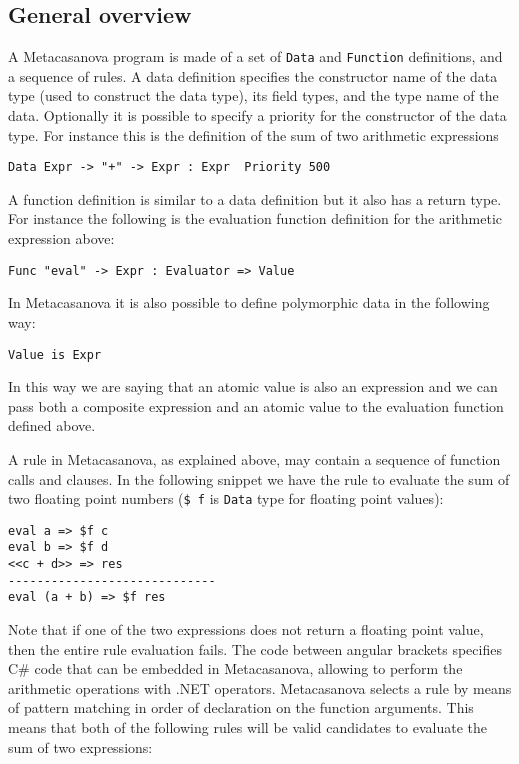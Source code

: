 \subsection{General overview}

A Metacasanova program is made of a set of \texttt{Data} and \texttt{Function} definitions, and a sequence of rules. A data definition specifies the constructor name of the data type (used to construct the data type), its field types, and the type name of the data. Optionally it is possible to specify a priority for the constructor of the data type. For instance this is the definition of the sum of two arithmetic expressions

\begin{lstlisting}
Data Expr -> "+" -> Expr : Expr  Priority 500
\end{lstlisting}

\noindent
A function definition is similar to a data definition but it also has a return type. For instance the following is the evaluation function definition for the arithmetic expression above:

\begin{lstlisting}
Func "eval" -> Expr : Evaluator => Value
\end{lstlisting}

\noindent
In Metacasanova it is also possible to define polymorphic data in the following way:

\begin{lstlisting}
Value is Expr
\end{lstlisting}

\noindent
In this way we are saying that an atomic value is also an expression and we can pass both a composite expression and an atomic value to the evaluation function defined above.

A rule in Metacasanova, as explained above, may contain a sequence of function calls and clauses. In the following snippet we have the rule to evaluate the sum of two floating point numbers (\texttt{\$ f} is \texttt{Data} type for floating point values):

\begin{lstlisting}
eval a => $f c
eval b => $f d
<<c + d>> => res
-----------------------------
eval (a + b) => $f res
\end{lstlisting}

\noindent
Note that if one of the two expressions does not return a floating point value, then the entire rule evaluation fails. The code between angular brackets specifies C\# code that can be embedded in Metacasanova, allowing to perform the arithmetic operations with .NET operators. Metacasanova selects a rule by means of pattern matching in order of declaration on the function arguments. This means that both of the following rules will be valid candidates to evaluate the sum of two expressions:

